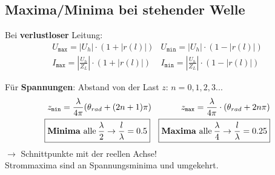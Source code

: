 \subsection{Maxima/Minima bei stehender Welle}\label{sec:max_min_stehende_welle}
Bei \textbf{verlustloser} Leitung:
\begin{align*}
	 & U_{\texttt{max}} = |U_h| \cdot (1+|r(l)|)                            & U_{\texttt{min}} = |U_h| \cdot (1-|r(l)|)                           & \\
	 & I_{\texttt{max}} = \left | \frac{U_h}{Z_L} \right | \cdot (1+|r(l)|) & I_{\texttt{min}} = \left| \frac{U_h}{Z_L} \right | \cdot (1-|r(l)|) &
\end{align*}

Für \textbf{Spannungen}: Abstand von der Last $ z $: \quad $ n=0,1,2,3... $
\begin{align*}
	                                                                                    & z_{\texttt{min}} = \frac{\lambda}{4\pi}(\theta_{rad}+(2n+1)\pi)                             &
	z_{\texttt{max}} = \frac{\lambda}{4\pi} \cdot (\theta_{rad}+2n\pi)                  &                                                                                               \\
	\Aboxed{                                                                            & \text{\textbf{Minima} alle}\: \frac{\lambda}{2} \rightarrow \frac{l}{\lambda}=0.5} \Aboxed{ &
	\text{\textbf{Maxima} alle}\: \frac{\lambda}{4} \rightarrow \frac{l}{\lambda}=0.25} &
\end{align*}
$ \rightarrow $ Schnittpunkte mit der reellen Achse!\\
Strommaxima sind an Spannungsminima und umgekehrt.

